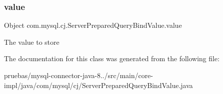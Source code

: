\subsubsection{\texorpdfstring{value}{value}}
{\footnotesize\ttfamily Object com.\+mysql.\+cj.\+Server\+Prepared\+Query\+Bind\+Value.\+value}

The value to store 

The documentation for this class was generated from the following file\+:\begin{DoxyCompactItemize}
\item 
pruebas/mysql-\/connector-\/java-\/8../src/main/core-\/impl/java/com/mysql/cj/Server\+Prepared\+Query\+Bind\+Value.\+java\end{DoxyCompactItemize}
